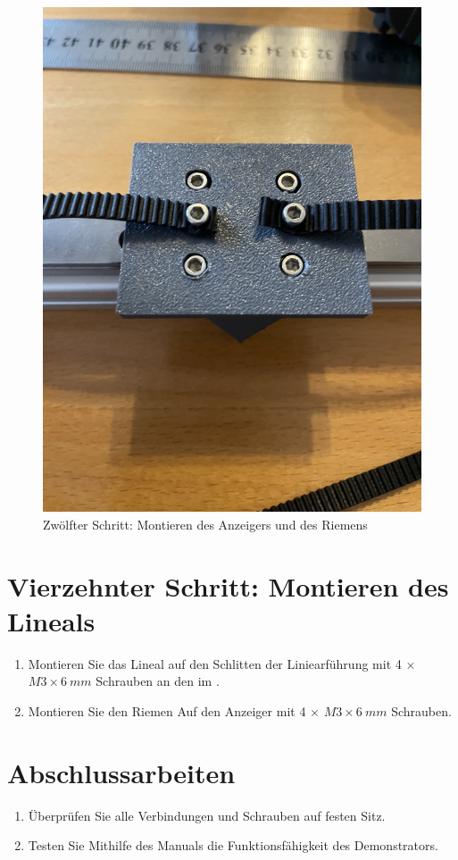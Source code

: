 \begin{figure}[H]
	\begin{center}
		\includegraphics[width=\textwidth]{Images/13Schr.jpg}
		\caption{Zwölfter Schritt: Montieren des Anzeigers und des Riemens} \label{13.S}
	\end{center}
\end{figure}


\section{Vierzehnter Schritt: Montieren des Lineals}

\begin{enumerate}
	\item Montieren Sie das Lineal auf den Schlitten der Liniearführung mit 4 $\times$ $ M3 \times 6 \ mm $ Schrauben an den im .
	\item Montieren Sie den Riemen Auf den Anzeiger mit 4 $\times$ $ M3 \times 6 \ mm $ Schrauben.
\end{enumerate}


\section{Abschlussarbeiten}

\begin{enumerate}
	\item Überprüfen Sie alle Verbindungen und Schrauben auf festen Sitz.
	\item Testen Sie Mithilfe des Manuals die Funktionsfähigkeit des Demonstrators. 
\end{enumerate}
